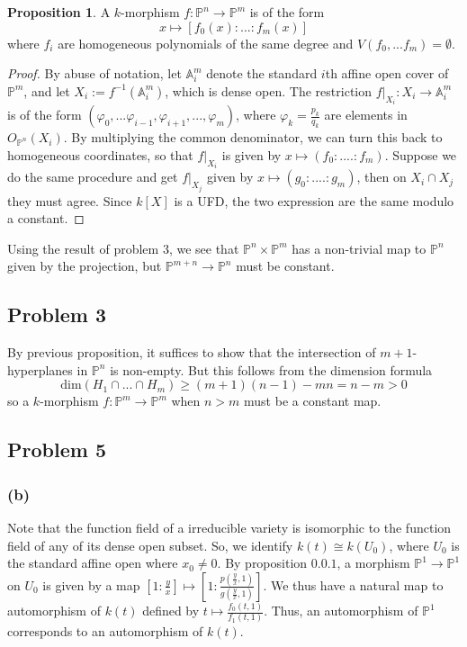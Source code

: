 \documentclass{article}
\theoremstyle{definition}
\theoremstyle{definition}
\theoremstyle{definition}
\theoremstyle{definition}
\newtheorem{proposition}{Proposition}[theorem]
\theoremstyle{definition}
\theoremstyle{definition}
\theoremstyle{definition}
\begin{document}
\begin{tcolorbox}[colback=blue!5!white,colframe=blue!30!white]
\begin{proposition}
A $k$-morphism $f:\mathbb{P}^n\to \mathbb{P}^m$ is of the form 
\[x\mapsto [f_0(x):...:f_m(x)]\]
where $f_i$ are homogeneous polynomials of the same degree and $V(f_0,...f_m)=\emptyset$.
\end{proposition}
\end{tcolorbox}
\begin{proof}
	By abuse of notation, let $\mathbb{A}_i^m$ denote the standard $i$th affine open cover of $\mathbb{P}^m$, and let $X_i:=f^{-1}(\mathbb{A}_i^m)$, which is dense open. The restriction $f|_{X_i}: X_i\to \mathbb{A}_i^m$ is of the form $(\varphi_0,...\varphi_{i-1},\varphi_{i+1},...,\varphi_m)$, where $\varphi_k=\frac{p_k}{q_k}$  are elements in $O_{\mathbb{P}^n}(X_i)$. By multiplying the common denominator, we can turn this back to homogeneous coordinates, so that $f|_{X_i}$ is given by $x\mapsto (f_0:....:f_m)$. Suppose we do the same procedure and get $f|_{X_j}$ given by $x\mapsto (g_0:....:g_m)$, then on $X_i\cap X_j$ they must agree. Since $k[X]$ is a UFD, the two expression are the same modulo a constant. 
\end{proof}

Using the result of problem $3$, we see that $\mathbb{P}^n\times \mathbb{P}^m$ has a non-trivial map to $\mathbb{P}^n$ given by the projection, but $\mathbb{P}^{m+n}\to \mathbb{P}^n$ must be constant. 



\subsection*{Problem 3}
By previous proposition, it suffices to show that the intersection of $m+1$-hyperplanes in $\mathbb{P}^n$ is non-empty. But this follows from the dimension formula
\[\textrm{dim}(H_1\cap...\cap H_m)\geq (m+1)(n-1)-mn=n-m>0\]
so a $k$-morphism $f: \mathbb{P}^m\to \mathbb{P}^m$ when $n>m$ must be a constant map. 

\subsection*{Problem 5}
\subsubsection*{(b)}
Note that the function field of a irreducible variety is isomorphic to the function field of any of its dense open subset. So, we identify $k(t)\cong k(U_0)$, where $U_0$ is the standard affine open where $x_0\neq 0$. 
By proposition $0.0.1$, a morphism $\mathbb{P}^1\to \mathbb{P}^1$ on $U_0$ is given by a map $[1: \frac{y}{x}]\mapsto [1: \frac{p(\frac{y}{x},1)}{g(\frac{y}{x},1)}]$. We thus have a natural map to automorphism of $k(t)$ defined by $t\mapsto \frac{f_0(t,1)}{f_1(t,1)}$.  Thus, an automorphism of $\mathbb{P}^1$ corresponds to an automorphism of $k(t)$. 
\end{document}
